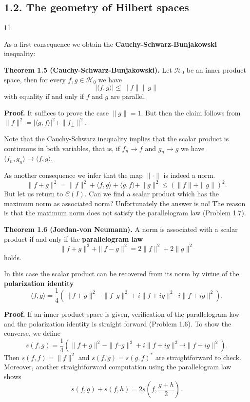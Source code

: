 \subsection*{1.2. The geometry of Hilbert spaces}
\hfill 11

As a first consequence we obtain the \textbf{Cauchy-Schwarz-Bunjakowski}
inequality:

\noindent\textbf{Theorem 1.5 (Cauchy-Schwarz-Bunjakowski).} Let $\mathcal{H}_0$ be an inner product
space, then for every $f, g \in \mathcal{H}_0$ we have
\[
|\langle f,g \rangle| \leq \|f\|\|g\|
\tag{1.26}
\]
with equality if and only if $f$ and $g$ are parallel.

\noindent\textbf{Proof.} It suffices to prove the case $\|g\| = 1$. But then the claim follows
from $\|f\|^2 = |\langle g, f \rangle|^2 + \|f_{\perp}\|^2$.

Note that the Cauchy-Schwarz inequality implies that the scalar product
is continuous in both variables, that is, if $f_n \to f$ and $g_n \to g$ we have
$\langle f_n, g_n \rangle \to \langle f, g \rangle$.

As another consequence we infer that the map $\|\cdot\|$ is indeed a norm.
\[
\|f + g\|^2 = \|f\|^2 + \langle f, g \rangle + \langle g, f \rangle + \|g\|^2 \leq (\|f\| + \|g\|)^2.
\tag{1.27}
\]
But let us return to $\mathcal{C}(I)$. Can we find a scalar product which has the
maximum norm as associated norm? Unfortunately the answer is no! The
reason is that the maximum norm does not satisfy the parallelogram law
(Problem 1.7).

\noindent\textbf{Theorem 1.6 (Jordan-von Neumann).} A norm is associated with a scalar
product if and only if the \textbf{parallelogram law}
\[
\|f + g\|^2 + \|f - g\|^2 = 2\|f\|^2 + 2\|g\|^2
\tag{1.28}
\]
holds.

In this case the scalar product can be recovered from its norm by virtue
of the \textbf{polarization identity}
\[
\langle f,g \rangle = \frac{1}{4} \left( \|f + g\|^2 - \|f – g\|^2 + i\|f + ig\|^2 – i\|f + ig\|^2 \right).
\tag{1.29}
\]

\noindent\textbf{Proof.} If an inner product space is given, verification of the parallelogram
law and the polarization identity is straight forward (Problem 1.6).
To show the converse, we define
\[
s(f,g) = \frac{1}{4} \left( \|f + g\|^2 - \|f – g\|^2 + i\|f + ig\|^2 – i\| f + ig\|^2 \right).
\tag{1.30}
\]
Then $s(f, f) = \|f\|^2$ and $s(f,g) = s(g, f)^*$ are straightforward to check.
Moreover, another straightforward computation using the parallelogram law
shows
\[
s(f,g) + s(f,h) = 2s\left(f, \frac{g+h}{2}\right).
\tag{1.31}
\]